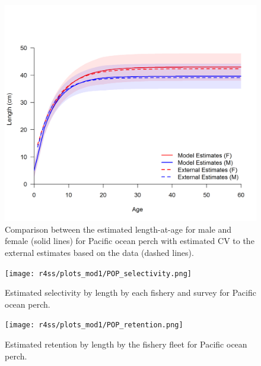 \documentclass[12pt,]{article}
\begin{document}
\FloatBarrier 

\begin{figure}
\centering
\includegraphics{Figures/Growth_Estimate_Comparison.png}
\caption{Comparison between the estimated length-at-age for male and
female (solid lines) for Pacific ocean perch with estimated CV to the
external estimates based on the data (dashed lines).
\label{fig:length_compare}}
\end{figure}

\FloatBarrier 

\begin{figure}
\centering
\texttt{[image: r4ss/plots\_mod1/POP\_selectivity.png]}
\caption{Estimated selectivity by length by each fishery and survey for
Pacific ocean perch. \label{fig:selex}}
\end{figure}

\FloatBarrier 

\begin{figure}
\centering
\texttt{[image: r4ss/plots\_mod1/POP\_retention.png]}
\caption{Estimated retention by length by the fishery fleet for Pacific
ocean perch. \label{fig:retention}}
\end{figure}

\FloatBarrier 
\end{document}
